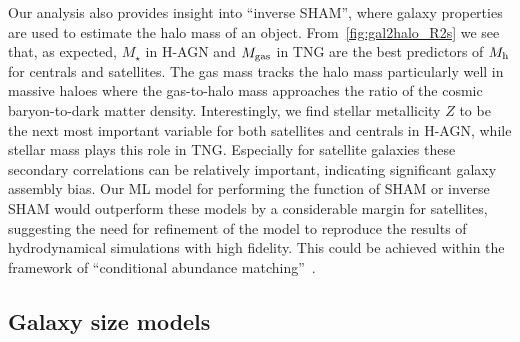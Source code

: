 \documentclass[useAMS,usenatbib]{mnras}
\begin{document}
Our analysis also provides insight into ``inverse SHAM'', where galaxy properties are used to estimate the halo mass of an object. From~\cref{fig:gal2halo_R2s} we see that, as expected, $M_\star$ in H-AGN and $M_{\rm gas}$ in TNG are the best predictors of $M_{\rm h}$ for centrals and satellites. The gas mass tracks the halo mass particularly well in massive haloes where the gas-to-halo mass approaches the ratio of the cosmic baryon-to-dark matter density. Interestingly, we find stellar metallicity $Z$ to be the next most important variable for both satellites and centrals in H-AGN, while stellar mass plays this role in TNG. Especially for satellite galaxies these secondary correlations can be relatively important, indicating significant galaxy assembly bias. Our ML model for performing the function of SHAM or inverse SHAM would outperform these models by a considerable margin for satellites, suggesting the need for refinement of the model to reproduce the results of hydrodynamical simulations with high fidelity. This could be achieved within the framework of ``conditional abundance matching''~\citep{CAM}.

\subsection{Galaxy size models}\label{sec:galaxy_size_models}
\end{document}
